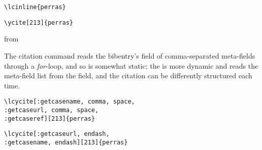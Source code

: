 
\begin{magpar}
\begin{verbatim}
\lcinline{perras}
\end{verbatim}
\end{magpar}


\begin{magpar}
\begin{verbatim}
\ycite[213]{perras}
\end{verbatim}
\end{magpar}

from


\p The  citation command reads the bibentry's  field of comma-separated meta-fields through a \textit{for}-loop, and so is somewhat static; the  is more dynamic and reads the meta-field list from the  field, and the citation can be differently structured each time.

\bigskip
{}
\begin{magpar}
\begin{verbatim}
\lcycite[:getcasename, comma, space, 
:getcaseurl, comma, space, 
:getcaseref][213]{perras}
\end{verbatim}
\end{magpar}

\bigskip
{}
\begin{magpar}
\begin{verbatim}
\lcycite[:getcaseurl, endash, 
:getcasename, endash][213]{perras}
\end{verbatim}
\end{magpar}










